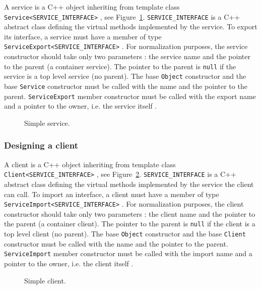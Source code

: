 A service is a C++ object inheriting from template class \texttt{Service<SERVICE\_INTERFACE>} , see Figure~\ref{fig:tms320c3x_simple_service}.
\texttt{SERVICE\_INTERFACE} is a C++ abstract class defining the virtual methods implemented by the service.
To export its interface, a service must have a member of type \texttt{ServiceExport<SERVICE\_INTERFACE>} .
For normalization purposes, the service constructor should take only two parameters : the service name and the pointer to the parent (a container service).
The pointer to the parent is \texttt{null} if the service is a top level service (no parent).
The base \texttt{Object} constructor  and the base \texttt{Service} constructor  must be called with the name and the pointer to the parent.
\texttt{ServiceExport} member constructor must be called with the export name and a pointer to the owner, i.e. the service itself .

\begin{figure}[h]
  \begin{center}
    
    \caption{\label{fig:tms320c3x_simple_service} Simple service.}
  \end{center}
\end{figure}

\subsubsection{Designing a client}

A client is a C++ object inheriting from template class \texttt{Client<SERVICE\_INTERFACE>} , see Figure~\ref{fig:tms320c3x_simple_client}.
\texttt{SERVICE\_INTERFACE} is a C++ abstract class defining the virtual methods implemented by the service the client can call.
To import an interface, a client must have a member of type \texttt{ServiceImport<SERVICE\_INTERFACE>} .
For normalization purposes, the client constructor should take only two parameters : the client name and the pointer to the parent (a container client).
The pointer to the parent is \texttt{null} if the client is a top level client (no parent).
The base \texttt{Object} constructor  and the base \texttt{Client} constructor  must be called with the name and the pointer to the parent.
\texttt{ServiceImport} member constructor must be called with the import name and a pointer to the owner, i.e. the client itself .


\begin{figure}[h]
  \begin{center}
    
    \caption{\label{fig:tms320c3x_simple_client} Simple client.}
  \end{center}
\end{figure}

